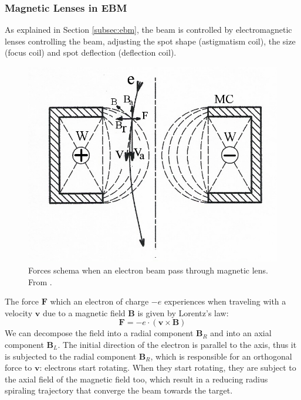 \subsubsection{Magnetic Lenses in EBM}
\label{sssec:magneticlens}
As explained in Section \ref{subsec:ebm}, the beam is controlled by electromagnetic lenses controlling the beam, adjusting the spot shape (astigmatism coil), the size (focus coil) and spot deflection (deflection coil).
\begin{figure}[H]
    \centering
    \includegraphics[scale=0.9]{Images/Magnetic_lens.jpg}
    \caption[Magnetic lens.]{Forces schema when an electron beam pass through magnetic lens. From \cite{various_magnetic_2023}.}
    \label{fig:magneticlens}
\end{figure}
The force $\mathbf{F}$ which an electron of charge $-e$ experiences when traveling with a velocity $\mathbf{v}$ due to a magnetic field $\mathbf{B}$ is given by Lorentz's law:
\begin{equation}
    \mathbf{F} = -e\cdot \left( \mathbf{v} \times \mathbf{B}\right)
\end{equation}
We can decompose the field into a radial component $\mathbf{B}_R$ and into an axial component $\mathbf{B}_L$. The initial direction of the electron is parallel to the axis, thus it is subjected to the radial component $\mathbf{B}_R$, which is responsible for an orthogonal force to $\mathbf{v}$: electrons start rotating. When they start rotating, they are subject to the axial field of the magnetic field too, which result in a reducing radius spiraling trajectory that converge the beam towards the target.


